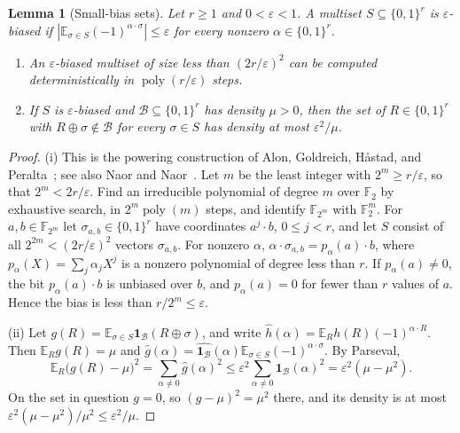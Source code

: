 \documentclass[11pt,letterpaper]{article}
\newtheorem{lemma}[theorem]{Lemma}
\theoremstyle{definition}
\theoremstyle{remark}
\newcommand{\E}{\mathbb E}
\newcommand{\poly}{\operatorname{poly}}
\newcommand{\ind}{\mathbf 1}
\newcommand{\abs}[1]{\left|#1\right|}
\begin{document}
\begin{lemma}[Small-bias sets]\label{lem:small-bias}
Let \(r\ge1\) and \(0<\varepsilon<1\). A multiset
\(S\subseteq\{0,1\}^r\) is \emph{\(\varepsilon\)-biased} if
\(\abs{\E_{\sigma\in S}(-1)^{\alpha\cdot\sigma}}\le\varepsilon\) for every
nonzero \(\alpha\in\{0,1\}^r\).
\begin{enumerate}[label=(\roman*)]
\item An \(\varepsilon\)-biased multiset of size less than
\((2r/\varepsilon)^2\) can be computed deterministically in
\(\poly(r/\varepsilon)\) steps.
\item If \(S\) is \(\varepsilon\)-biased and
\(\mathcal B\subseteq\{0,1\}^r\) has density \(\mu>0\), then the set of
\(R\in\{0,1\}^r\) with \(R\oplus\sigma\notin\mathcal B\) for every
\(\sigma\in S\) has density at most \(\varepsilon^2/\mu\).
\end{enumerate}
\end{lemma}
\begin{proof}
(i) This is the powering construction of Alon, Goldreich, H\aa{}stad,
and Peralta~\cite{AGHP92}; see also Naor and Naor~\cite{NN93}. Let \(m\)
be the least integer with \(2^m\ge r/\varepsilon\), so that
\(2^m<2r/\varepsilon\). Find an irreducible polynomial of degree \(m\)
over \(\mathbb F_2\) by exhaustive search, in \(2^m\poly(m)\) steps, and
identify \(\mathbb F_{2^m}\) with \(\mathbb F_2^m\). For
\(a,b\in\mathbb F_{2^m}\) let \(\sigma_{a,b}\in\{0,1\}^r\) have
coordinates \(a^j\cdot b\), \(0\le j<r\), and let \(S\) consist of all
\(2^{2m}<(2r/\varepsilon)^2\) vectors \(\sigma_{a,b}\). For nonzero
\(\alpha\), \(\alpha\cdot\sigma_{a,b}=p_\alpha(a)\cdot b\), where
\(p_\alpha(X)=\sum_j\alpha_jX^j\) is a nonzero polynomial of degree less
than \(r\). If \(p_\alpha(a)\ne0\), the bit \(p_\alpha(a)\cdot b\) is
unbiased over \(b\), and \(p_\alpha(a)=0\) for fewer than \(r\) values
of \(a\). Hence the bias is less than \(r/2^m\le\varepsilon\).

(ii) Let \(g(R)=\E_{\sigma\in S}\ind_{\mathcal B}(R\oplus\sigma)\), and
write \(\widehat h(\alpha)=\E_R h(R)(-1)^{\alpha\cdot R}\). Then
\(\E_Rg(R)=\mu\) and
\(\widehat g(\alpha)=\widehat{\ind_{\mathcal B}}(\alpha)
\E_{\sigma\in S}(-1)^{\alpha\cdot\sigma}\). By Parseval,
\[
 \E_R\bigl(g(R)-\mu\bigr)^2=\sum_{\alpha\ne0}\widehat g(\alpha)^2
 \le\varepsilon^2\sum_{\alpha\ne0}\widehat{\ind_{\mathcal B}}(\alpha)^2
 =\varepsilon^2(\mu-\mu^2).
\]
On the set in question \(g=0\), so \((g-\mu)^2=\mu^2\) there, and its
density is at most \(\varepsilon^2(\mu-\mu^2)/\mu^2\le\varepsilon^2/\mu\).
\end{proof}
\end{document}
